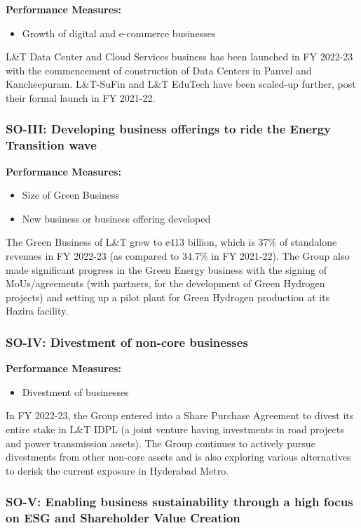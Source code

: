 \textbf{Performance Measures:}
\begin{itemize}
    \item Growth of digital and e-commerce businesses
\end{itemize}

L\&T Data Center and Cloud Services business has been launched in FY 2022-23 with the commencement of construction of Data Centers in Panvel and Kancheepuram. L\&T-SuFin and L\&T EduTech have been scaled-up further, post their formal launch in FY 2021-22.

\subsubsection{SO-III: Developing business offerings to ride the Energy Transition wave}

\textbf{Performance Measures:}
\begin{itemize}
    \item Size of Green Business
    \item New business or business offering developed
\end{itemize}

The Green Business of L\&T grew to ¢413 billion, which is 37\% of standalone revenues in FY 2022-23 (as compared to 34.7\% in FY 2021-22). The Group also made significant progress in the Green Energy business with the signing of MoUs/agreements (with partners, for the development of Green Hydrogen projects) and setting up a pilot plant for Green Hydrogen production at its Hazira facility.

\subsubsection{SO-IV: Divestment of non-core businesses}

\textbf{Performance Measures:}
\begin{itemize}
    \item Divestment of businesses
\end{itemize}

In FY 2022-23, the Group entered into a Share Purchase Agreement to divest its entire stake in L\&T IDPL (a joint venture having investments in road projects and power transmission assets). The Group continues to actively pursue divestments from other non-core assets and is also exploring various alternatives to derisk the current exposure in Hyderabad Metro.

\subsubsection{SO-V: Enabling business sustainability through a high focus on ESG and Shareholder Value Creation}

